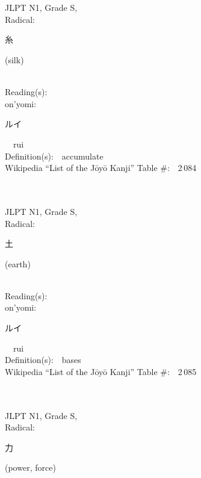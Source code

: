 \begin{multicols}{2}
\ \ \\
{\fontsize{34pt}{40pt}  }\ \ \\
{JLPT N1, Grade S, \\Radical:\ \ {\begin{CJK}{UTF8}{min} 糸 \end{CJK}} (silk) } \\
Reading(s):\ \ \\
{\hspace*{1em}}on'yomi:\ \ \\
{\hspace*{2em}}{\begin{CJK}{UTF8}{min} ルイ \end{CJK}}\ \ rui\ \ \\
Definition(s):\ \ accumulate \\
Wikipedia ``List of the J\=oy\=o Kanji'' Table \#:\ \ 2\,084 \\
\ \ \\
{\fontsize{34pt}{40pt}  }\ \ \\
{JLPT N1, Grade S, \\Radical:\ \ {\begin{CJK}{UTF8}{min} 土 \end{CJK}} (earth) } \\
Reading(s):\ \ \\
{\hspace*{1em}}on'yomi:\ \ \\
{\hspace*{2em}}{\begin{CJK}{UTF8}{min} ルイ \end{CJK}}\ \ rui\ \ \\
Definition(s):\ \ bases \\
Wikipedia ``List of the J\=oy\=o Kanji'' Table \#:\ \ 2\,085 \\
\ \ \\
{\fontsize{34pt}{40pt}  }\ \ \\
{JLPT N1, Grade S, \\Radical:\ \ {\begin{CJK}{UTF8}{min} 力 \end{CJK}} (power, force) } \\

\end{multicols}
